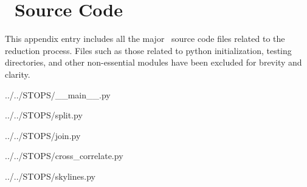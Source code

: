 \chapter{\stops\ Source Code} \label{app:code}

This appendix entry includes all the major \stops\ source code files related to the reduction process. Files such as those related to python initialization, testing directories, and other non-essential modules have been excluded for brevity and clarity.


{../../STOPS/__main__.py}
\clearpage


{../../STOPS/split.py}
\clearpage


{../../STOPS/join.py}
\clearpage


{../../STOPS/cross_correlate.py}
\clearpage


{../../STOPS/skylines.py}
